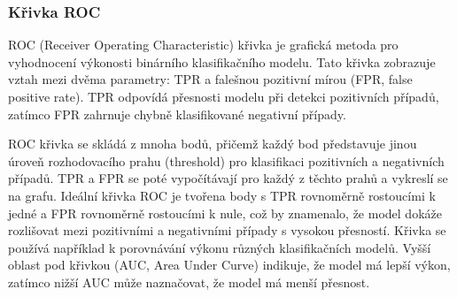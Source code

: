 


\subsubsection{Křivka ROC}
\gls{ROC} (Receiver Operating Characteristic) křivka je grafická metoda pro
vyhodnocení výkonosti binárního klasifikačního modelu. Tato křivka zobrazuje
vztah mezi dvěma parametry: \gls{TPR} a falešnou pozitivní mírou (\gls{FPR},
false positive rate). \gls{TPR} odpovídá přesnosti modelu při detekci
pozitivních případů, zatímco FPR zahrnuje chybně klasifikované negativní
případy.

\gls{ROC} křivka se skládá z mnoha bodů, přičemž každý bod představuje jinou
úroveň rozhodovacího prahu (threshold) pro klasifikaci pozitivních a negativních
případů. \gls{TPR} a \gls{FPR} se poté vypočítávají pro každý z těchto prahů a
vykreslí se na grafu. Ideální křivka ROC je tvořena body s TPR rovnoměrně
rostoucími k jedné a \gls{FPR} rovnoměrně rostoucími k nule, což by znamenalo,
že model dokáže rozlišovat mezi pozitivními a negativními případy s vysokou
přesností. Křivka se používá například k porovnávání výkonu různých
klasifikačních modelů. Vyšší oblast pod křivkou (\gls{AUC}, Area Under Curve)
indikuje, že model má lepší výkon, zatímco nižší \gls{AUC} může naznačovat, že
model má menší přesnost.